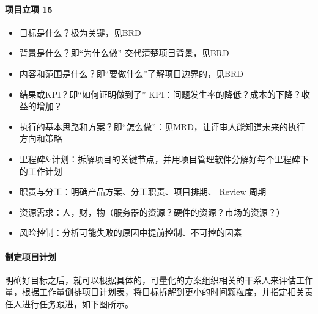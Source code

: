 \documentclass[letterpaper,11pt,english]{sphinxmanual}
\begin{document}
\paragraph{项目立项 15\sphinxfootnotemark[559]}
\label{\detokenize{chapter_knowledge/project_manage:id7}}%
\begin{footnotetext}[559]\sphinxAtStartFootnote
{}
%
\end{footnotetext}\ignorespaces \begin{itemize}
\item {} 
目标是什么？极为关键，见BRD

\item {} 
背景是什么？即“为什么做” 交代清楚项目背景，见BRD

\item {} 
内容和范围是什么？即“要做什么”了解项目边界的，见BRD

\item {} 
结果或KPI？即“如何证明做到了”
KPI：问题发生率的降低？成本的下降？收益的增加？

\item {} 
执行的基本思路和方案？即“怎么做”：见MRD，让评审人能知道未来的执行方向和策略

\item {} 
里程碑\&计划：拆解项目的关键节点，并用项目管理软件分解好每个里程碑下的工作计划

\item {} 
职责与分工：明确产品方案、分工职责、项目排期、 Review 周期
%
\begin{footnote}[560]\sphinxAtStartFootnote
{}
%
\end{footnote}

\item {} 
资源需求：人，财，物（服务器的资源？硬件的资源？市场的资源？）

\item {} 
风险控制：分析可能失败的原因中提前控制、不可控的因素

\end{itemize}


\paragraph{制定项目计划}
\label{\detokenize{chapter_knowledge/project_manage:id8}}
明确好目标之后，就可以根据具体的，可量化的方案组织相关的干系人来评估工作量，根据工作量倒排项目计划表，将目标拆解到更小的时间颗粒度，并指定相关责任人进行任务跟进，如下图所示。
\end{document}
